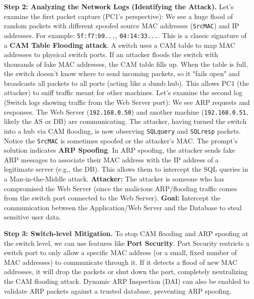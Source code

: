 \documentclass{article}
\begin{document}
\textbf{Step 2: Analyzing the Network Logs (Identifying the Attack).}
Let's examine the first packet capture (PC1's perspective):
We see a huge flood of random packets with different spoofed source MAC addresses (\texttt{SrcMAC}) and IP addresses. For example: \texttt{5f:f7:b9...}, \texttt{04:14:33...}. This is a classic signature of a \textbf{CAM Table Flooding attack}.
A switch uses a CAM table to map MAC addresses to physical switch ports. If an attacker floods the switch with thousands of fake MAC addresses, the CAM table fills up. When the table is full, the switch doesn't know where to send incoming packets, so it "fails open" and broadcasts all packets to all ports (acting like a dumb hub). This allows PC1 (the attacker) to sniff traffic meant for other machines.
Let's examine the second log (Switch logs showing traffic from the Web Server port):
We see ARP requests and responses. The Web Server (\texttt{192.168.0.50}) and another machine (\texttt{192.168.0.51}, likely the AS or DB) are communicating. The attacker, having turned the switch into a hub via CAM flooding, is now observing \texttt{SQLquery} and \texttt{SQLresp} packets.
Notice the \texttt{SrcMAC} is sometimes spoofed or the attacker's MAC. The prompt's solution indicates \textbf{ARP Spoofing}. In ARP spoofing, the attacker sends fake ARP messages to associate their MAC address with the IP address of a legitimate server (e.g., the DB). This allows them to intercept the SQL queries in a Man-in-the-Middle attack.
\textbf{Attacker:} The attacker is someone who has compromised the Web Server (since the malicious ARP/flooding traffic comes from the switch port connected to the Web Server).
\textbf{Goal:} Intercept the communication between the Application/Web Server and the Database to steal sensitive user data.

\textbf{Step 3: Switch-level Mitigation.}
To stop CAM flooding and ARP spoofing at the switch level, we can use features like \textbf{Port Security}. Port Security restricts a switch port to only allow a specific MAC address (or a small, fixed number of MAC addresses) to communicate through it. If it detects a flood of new MAC addresses, it will drop the packets or shut down the port, completely neutralizing the CAM flooding attack. Dynamic ARP Inspection (DAI) can also be enabled to validate ARP packets against a trusted database, preventing ARP spoofing.
\end{document}
